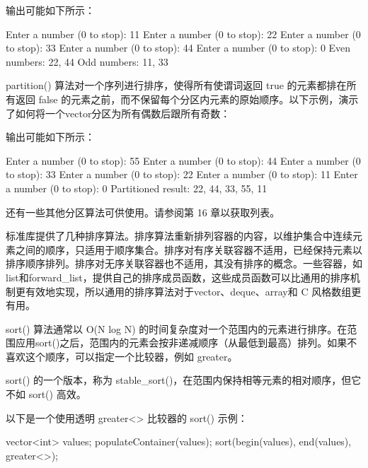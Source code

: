 输出可能如下所示：

\begin{shell}
Enter a number (0 to stop): 11
Enter a number (0 to stop): 22
Enter a number (0 to stop): 33
Enter a number (0 to stop): 44
Enter a number (0 to stop): 0
Even numbers: 22, 44
Odd numbers: 11, 33
\end{shell}

partition() 算法对一个序列进行排序，使得所有使谓词返回 true 的元素都排在所有返回 false 的元素之前，而不保留每个分区内元素的原始顺序。以下示例，演示了如何将一个vector分区为所有偶数后跟所有奇数：


输出可能如下所示：

\begin{shell}
Enter a number (0 to stop): 55
Enter a number (0 to stop): 44
Enter a number (0 to stop): 33
Enter a number (0 to stop): 22
Enter a number (0 to stop): 11
Enter a number (0 to stop): 0
Partitioned result: 22, 44, 33, 55, 11
\end{shell}

还有一些其他分区算法可供使用。请参阅第 16 章以获取列表。


标准库提供了几种排序算法。排序算法重新排列容器的内容，以维护集合中连续元素之间的顺序，只适用于顺序集合。排序对有序关联容器不适用，已经保持元素以排序顺序排列。排序对无序关联容器也不适用，其没有排序的概念。一些容器，如list和forward\_list，提供自己的排序成员函数，这些成员函数可以比通用的排序机制更有效地实现，所以通用的排序算法对于vector、deque、array和 C 风格数组更有用。

sort() 算法通常以 O(N log N) 的时间复杂度对一个范围内的元素进行排序。在范围应用sort()之后，范围内的元素会按非递减顺序（从最低到最高）排列。如果不喜欢这个顺序，可以指定一个比较器，例如 greater。

sort() 的一个版本，称为 stable\_sort()，在范围内保持相等元素的相对顺序，但它不如 sort() 高效。

以下是一个使用透明 greater<> 比较器的 sort() 示例：

\begin{cpp}
vector<int> values;
populateContainer(values);
sort(begin(values), end(values), greater<>{});
\end{cpp}

